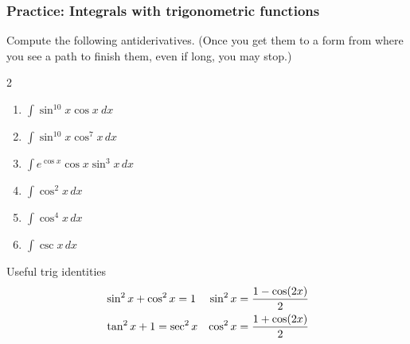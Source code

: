 \begin{frame}[t]
	\fontsize{13}{13}\selectfont
	\frametitle{Practice: Integrals with trigonometric functions}

	Compute the following antiderivatives. (Once you get them to a form from where
	you see a path to finish them, even if long, you may stop.)

	\begin{multicols}{2}
		\begin{enumerate}
			\item $\displaystyle \int \sin^{10}x \cos x \ dx$
				\vspace{.2cm}

			\item $\displaystyle \int \sin^{10}x \cos^{7}x \, dx$
				\vspace{.2cm}

			\item $\displaystyle \int e^{\cos x}\cos x \sin^{3}x \, dx$
				\vspace{.2cm}

			\item $\displaystyle \int \cos^{2}x \, dx$
				\vspace{.2cm}

			\item $\displaystyle \int \cos^{4}x \, dx$
				\vspace{.2cm}

			\item $\displaystyle \int \csc x \, dx$
				\vspace{.2cm}
		\end{enumerate}
	\end{multicols}

	\vspace{-.5cm}
	{\fontsize{10}{10}\selectfont \begin{block}{ \fontsize{12}{12}\selectfont Useful trig identities}\vspace{-.5cm} \begin{align*}\large&\sin^{2}x + \cos^{2}x = 1&\sin^{2}x&= \frac{1 - \cos (2x)}{2}\\&\tan^{2}x + 1 = \sec^{2}x&\cos^{2}x&= \frac{1 + \cos (2x)}{2}\end{align*}\end{block} }
\end{frame}

